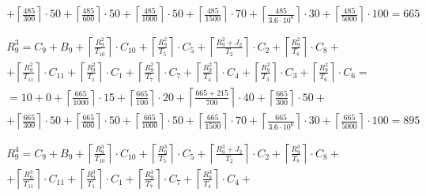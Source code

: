 \begin{gather*}
\begin{multlined}
    + \left\lceil\frac{485}{300}\right\rceil\cdot 50 + %
    \left\lceil\frac{485}{600}\right\rceil\cdot 50 + %
    \left\lceil\frac{485}{1000}\right\rceil\cdot 50 +%
    \left\lceil\frac{485}{1500}\right\rceil\cdot 70 +%
    \left\lceil\frac{485}{3.6 \cdot 10^6}\right\rceil\cdot 30 +%
    \left\lceil\frac{485}{5000}\right\rceil\cdot 100 = 665 \\
  \end{multlined} \\
  \begin{multlined}
    R_9^3 = C_9 + B_9 + \left\lceil\frac{R_9^2}{T_{10}}\right\rceil\cdot C_{10} + %
    \left\lceil\frac{R_9^2}{T_5}\right\rceil\cdot C_5 + %
    \left\lceil\frac{R_9^2 + J_2}{T_2}\right\rceil\cdot C_2 + %
    \left\lceil\frac{R_9^2}{T_8}\right\rceil\cdot C_8 + \\%
    + \left\lceil\frac{R_9^2}{T_{11}}\right\rceil\cdot C_{11} + %
    \left\lceil\frac{R_9^2}{T_1}\right\rceil\cdot C_1 +%
    \left\lceil\frac{R_9^2}{T_7}\right\rceil\cdot C_7 +%
    \left\lceil\frac{R_9^2}{T_4}\right\rceil\cdot C_4 +%
    \left\lceil\frac{R_9^2}{T_3}\right\rceil\cdot C_3 +%
    \left\lceil\frac{R_9^2}{T_6}\right\rceil\cdot C_6 = \\%
    = 10 + 0 + \left\lceil\frac{665}{1000}\right\rceil\cdot 15 + %
    \left\lceil\frac{665}{100}\right\rceil\cdot 20 + %
    \left\lceil\frac{665 + 215}{700}\right\rceil\cdot 40 + %
    \left\lceil\frac{665}{300}\right\rceil\cdot 50 + \\%
    + \left\lceil\frac{665}{300}\right\rceil\cdot 50 + %
    \left\lceil\frac{665}{600}\right\rceil\cdot 50 + %
    \left\lceil\frac{665}{1000}\right\rceil\cdot 50 +%
    \left\lceil\frac{665}{1500}\right\rceil\cdot 70 +%
    \left\lceil\frac{665}{3.6 \cdot 10^6}\right\rceil\cdot 30 +%
    \left\lceil\frac{665}{5000}\right\rceil\cdot 100 = 895 \\
  \end{multlined} \\
  \begin{multlined}
    R_9^4 = C_9 + B_9 + \left\lceil\frac{R_9^3}{T_{10}}\right\rceil\cdot C_{10} + %
    \left\lceil\frac{R_9^3}{T_5}\right\rceil\cdot C_5 + %
    \left\lceil\frac{R_9^3 + J_2}{T_2}\right\rceil\cdot C_2 + %
    \left\lceil\frac{R_9^3}{T_8}\right\rceil\cdot C_8 + \\%
    + \left\lceil\frac{R_9^3}{T_{11}}\right\rceil\cdot C_{11} + %
    \left\lceil\frac{R_9^3}{T_1}\right\rceil\cdot C_1 +%
    \left\lceil\frac{R_9^3}{T_7}\right\rceil\cdot C_7 +%
    \left\lceil\frac{R_9^3}{T_4}\right\rceil\cdot C_4 +%

\end{multlined}
\end{gather*}
